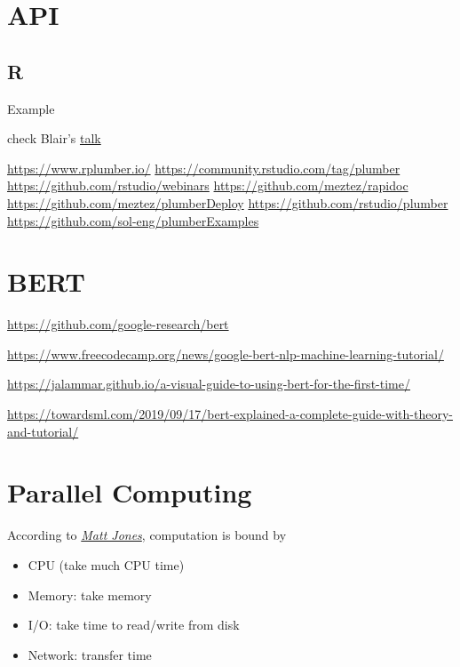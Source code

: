 \documentclass[
]{book}
\begin{document}
\hypertarget{api}{%
\chapter{API}\label{api}}

\hypertarget{r}{%
\section{R}\label{r}}

Example

check Blair's \href{https://github.com/blairj09-talks/plumber-webinar-2020}{talk}

\url{https://www.rplumber.io/}
\url{https://community.rstudio.com/tag/plumber}
\url{https://github.com/rstudio/webinars}
\url{https://github.com/meztez/rapidoc}
\url{https://github.com/meztez/plumberDeploy}
\url{https://github.com/rstudio/plumber}
\url{https://github.com/sol-eng/plumberExamples}

\hypertarget{bert}{%
\chapter{BERT}\label{bert}}

\url{https://github.com/google-research/bert}

\url{https://www.freecodecamp.org/news/google-bert-nlp-machine-learning-tutorial/}

\url{https://jalammar.github.io/a-visual-guide-to-using-bert-for-the-first-time/}

\url{https://towardsml.com/2019/09/17/bert-explained-a-complete-guide-with-theory-and-tutorial/}

\hypertarget{parallel-computing}{%
\chapter{Parallel Computing}\label{parallel-computing}}

According to \href{https://nceas.github.io/oss-lessons/parallel-computing-in-r/parallel-computing-in-r.html}{\emph{Matt Jones}}, computation is bound by

\begin{itemize}
\item
  CPU (take much CPU time)
\item
  Memory: take memory
\item
  I/O: take time to read/write from disk
\item
  Network: transfer time
\end{itemize}
\end{document}
